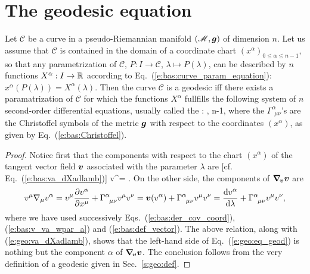 
\section{The geodesic equation}

\begin{greybox}
Let $\mathcal{C}$ be a curve in a pseudo-Riemannian
manifold $(\mathscr{M},\bm{g})$ of dimension $n$. Let us assume that
$\mathcal{C}$ is contained in the domain of a coordinate chart $(x^\alpha)_{0\leq\alpha\leq n-1}$,
so that any parametrization of $\mathcal{C}$, $P: I \to  \mathcal{C}$, $\lambda\mapsto P(\lambda)$,
can be described by $n$ functions $X^\alpha: I\to \mathbb{R}$
according to Eq.~(\ref{e:bas:curve_param_equation}): $x^\alpha(P(\lambda)) = X^\alpha(\lambda)$.
Then the curve $\mathcal{C}$ is a geodesic iff there exists a paramatrization of $\mathcal{C}$
for which the functions $X^\alpha$ fullfills the following
system of $n$ second-order differential equations, usually called the
:
\be \label{e:geo:eq_geod}
    ,   \leq \alpha \leq n-1,
\ee
where the $\Gamma^\alpha_{\ \, \mu \nu}$'s are the Christoffel symbols of the metric $\bm{g}$
with respect to the coordinates $(x^\alpha)$, as given by Eq.~(\ref{e:bas:Christoffel}).
\end{greybox}
\begin{proof}
Notice first that the components with respect
to the chart $(x^\alpha)$ of the tangent
vector field $\bm{v}$ associated with the parameter $\lambda$ are [cf. Eq.~(\ref{e:bas:va_dXadlamb})]
\be \label{e:geo:va_dXadlamb}
    v^\alpha =  .
\ee
On the other side, the components of $\bm{\nabla}_{\!\bm{v}}\bm{v}$ are
\[
    v^\mu \nabla_\mu v^\alpha = v^\mu \frac{\partial v^\alpha}{\partial x^\mu} + \Gamma^\alpha_{\ \, \mu \nu} v^\mu v^\nu
    = \bm{v}(v^\alpha) + \Gamma^\alpha_{\ \, \mu \nu} v^\mu v^\nu
    = \frac{\mathrm{d} v^\alpha}{\mathrm{d} \lambda} + \Gamma^\alpha_{\ \, \mu \nu} v^\mu v^\nu ,
\]
where we have used
successively Eqs.~(\ref{e:bas:der_cov_coord}), (\ref{e:bas:v_va_wpar_a}) and
(\ref{e:bas:def_vector}). The above relation, along with (\ref{e:geo:va_dXadlamb}),
shows that the left-hand side of
Eq.~(\ref{e:geo:eq_geod}) is nothing but the component $\alpha$ of
$\bm{\nabla}_{\!\bm{v}}\bm{v}$. The conclusion follows from the very definition
of a geodesic given in Sec.~\ref{s:geo:def}.
\end{proof}

